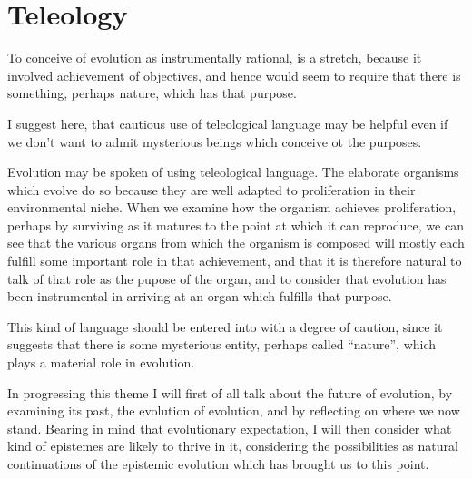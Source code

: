 \section{Teleology}

To conceive of evolution as instrumentally rational, is a stretch, because it involved achievement of objectives, and hence would seem to require that there is something, perhaps nature, which has that purpose.

I suggest here, that cautious use of teleological language may be helpful even if we don't want to admit mysterious beings which conceive ot the purposes.

Evolution may be spoken of using teleological language.
The elaborate organisms which evolve do so because they are well adapted to proliferation in their environmental niche.
When we examine how the organism achieves proliferation, perhaps by surviving as it matures to the point at which it can reproduce, we can see that the various organs from which the organism is composed will mostly each fulfill some important role in that achievement, and that it is therefore natural to talk of that role as the pupose of the organ, and to consider that evolution has been instrumental in arriving at an organ which fulfills that purpose.

This kind of language should be entered into with a degree of caution, since it suggests that there is some mysterious entity, perhaps called ``nature'', which plays a material role in evolution.


In progressing this theme I will first of all talk about the future of evolution, by examining its past, the evolution of evolution, and by reflecting on where we now stand.
Bearing in mind that evolutionary expectation, I will then consider what kind of epistemes are likely to thrive in it, considering the possibilities as natural continuations of the epistemic evolution which has brought us to this point.

